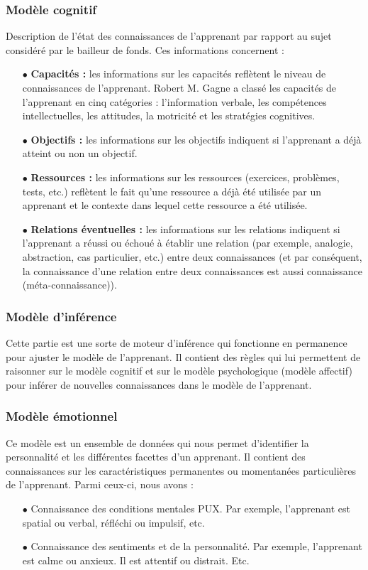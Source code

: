 \subsubsection{Modèle cognitif}
Description de l’état des connaissances de l’apprenant par rapport au sujet considéré par le bailleur de fonds. Ces informations concernent :
\begin{itemize}
	\item[$\bullet$] \textbf{Capacités :} les informations sur les capacités reflètent le niveau de connaissances de l'apprenant. Robert M. Gagne a classé les capacités de l’apprenant en cinq catégories : l’information verbale, les compétences intellectuelles, les attitudes, la motricité et les stratégies cognitives.
	\item[$\bullet$] \textbf{Objectifs :} les informations sur les objectifs indiquent si l'apprenant a déjà atteint ou non un objectif.
	\item[$\bullet$] \textbf{Ressources :} les informations sur les ressources (exercices, problèmes, tests, etc.) reflètent le fait qu'une ressource a déjà été utilisée par un apprenant et le contexte dans lequel cette ressource a été utilisée.
	\item[$\bullet$] \textbf{Relations éventuelles :} les informations sur les relations indiquent si l'apprenant a réussi ou échoué à établir une relation (par exemple, analogie, abstraction, cas particulier, etc.) entre deux connaissances (et par conséquent, la connaissance d'une relation entre deux connaissances est aussi connaissance (méta-connaissance)).
\end{itemize}

\subsubsection{Modèle d'inférence}
Cette partie est une sorte de moteur d’inférence qui fonctionne en permanence pour ajuster le modèle de l’apprenant. Il contient des règles qui lui permettent de raisonner sur le modèle cognitif et sur le modèle psychologique (modèle affectif) pour inférer de nouvelles connaissances dans le modèle de l’apprenant.

\subsubsection{Modèle émotionnel}
Ce modèle est un ensemble de données qui nous permet d'identifier la personnalité et les différentes facettes d'un apprenant. Il contient des connaissances sur les caractéristiques permanentes ou momentanées particulières de l’apprenant. Parmi ceux-ci, nous avons :
\begin{itemize}
	\item[$\bullet$] Connaissance des conditions mentales PUX. Par exemple, l'apprenant est spatial ou verbal, réfléchi ou impulsif, etc.
	\item[$\bullet$] Connaissance des sentiments et de la personnalité. Par exemple, l'apprenant est calme ou anxieux. Il est attentif ou distrait. Etc.
\end{itemize}

